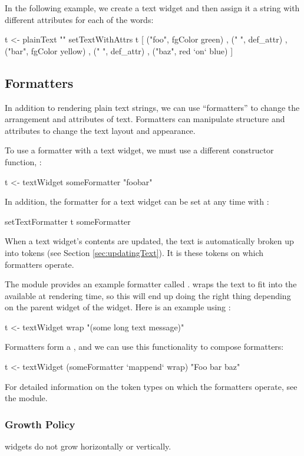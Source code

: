 In the following example, we create a text widget and then assign it a
string with different attributes for each of the words:

\begin{haskellcode}
 t <- plainText ""
 setTextWithAttrs t [ ("foo", fgColor green)
                    , (" ", def_attr)
                    , ("bar", fgColor yellow)
                    , (" ", def_attr)
                    , ("baz", red `on` blue)
                    ]
\end{haskellcode}

\subsection{Formatters}

In addition to rendering plain text strings, we can use ``formatters''
to change the arrangement and attributes of text.  Formatters can
manipulate structure and attributes to change the text layout and
appearance.

To use a formatter with a text widget, we must use a different
constructor function, :

\begin{haskellcode}
 t <- textWidget someFormatter "foobar"
\end{haskellcode}

In addition, the formatter for a text widget can be set at any time
with :

\begin{haskellcode}
 setTextFormatter t someFormatter
\end{haskellcode}

When a text widget's contents are updated, the text is automatically
broken up into tokens (see Section \ref{sec:updatingText}).  It is
these tokens on which formatters operate.

The  module provides an example formatter called .
 wraps the text to fit into the  available
at rendering time, so this will end up doing the right thing depending
on the parent widget of the  widget.  Here is an
example using :

\begin{haskellcode}
 t <- textWidget wrap "(some long text message)"
\end{haskellcode}

Formatters form a , and we can use this functionality to
compose formatters:

\begin{haskellcode}
 t <- textWidget (someFormatter `mappend` wrap) "Foo bar baz"
\end{haskellcode}

For detailed information on the token types on which the formatters
operate, see the  module.

\subsubsection{Growth Policy}

 widgets do not grow horizontally or vertically.
